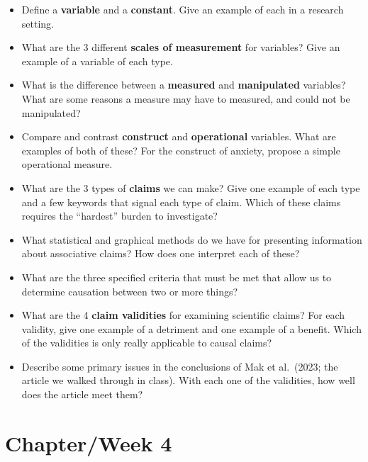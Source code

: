 \documentclass[
  12pt,
  letterpaper,
]{scrartcl}
\begin{document}
\begin{itemize}
\item
  Define a \textbf{variable} and a \textbf{constant}. Give an example of
  each in a research setting.
\item
  What are the 3 different \textbf{scales of measurement} for variables?
  Give an example of a variable of each type.
\item
  What is the difference between a \textbf{measured} and
  \textbf{manipulated} variables? What are some reasons a measure may
  have to measured, and could not be manipulated?
\item
  Compare and contrast \textbf{construct} and \textbf{operational}
  variables. What are examples of both of these? For the construct of
  anxiety, propose a simple operational measure.
\item
  What are the 3 types of \textbf{claims} we can make? Give one example
  of each type and a few keywords that signal each type of claim. Which
  of these claims requires the ``hardest'' burden to investigate?
\item
  What statistical and graphical methods do we have for presenting
  information about associative claims? How does one interpret each of
  these?
\item
  What are the three specified criteria that must be met that allow us
  to determine causation between two or more things?
\item
  What are the 4 \textbf{claim validities} for examining scientific
  claims? For each validity, give one example of a detriment and one
  example of a benefit. Which of the validities is only really
  applicable to causal claims?
\item
  Describe some primary issues in the conclusions of Mak et al.~(2023;
  the article we walked through in class). With each one of the
  validities, how well does the article meet them?
\end{itemize}

\section{Chapter/Week 4}\label{sec-ch-4}
\end{document}
